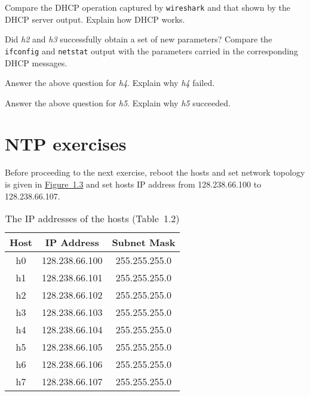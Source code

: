 \documentclass{../UTNetLab}
\begin{document}
    \begin{report}
        \item Compare the DHCP operation captured by \lstinline{wireshark} and that shown by the DHCP server output.
            Explain how DHCP works.
        
        \item Did \textit{h2} and \textit{h3} successfully obtain a set of new parameters?
            Compare the \lstinline{ifconfig} and \lstinline{netstat} output with the parameters carried in the corresponding DHCP messages.
        
        \item Answer the above question for \textit{h4}.
            Explain why \textit{h4} failed.
        
        \item Answer the above question for \textit{h5}.
            Explain why \textit{h5} succeeded.
    \end{report}

\part{NTP exercises}
    Before proceeding to the next exercise, reboot the hosts and set network topology is given in \hyperref[fig:1.3]{Figure~1.3} and set hosts IP address from 128.238.66.100 to 128.238.66.107.
    \begin{center}
        \begin{minipage}{0.48\textwidth}
            \begin{flushleft}
                \begin{table}[H]
                    \caption{The IP addresses of the hosts (Table~1.2)}
                    \centering
                    \begin{tabular}{ c c c }
                        \hline \hline
                        Host & IP Address & Subnet Mask \\
                        \hline 
                        h0 & 128.238.66.100 & 255.255.255.0 \\
                        h1 & 128.238.66.101 & 255.255.255.0 \\
                        h2 & 128.238.66.102 & 255.255.255.0 \\
                        h3 & 128.238.66.103 & 255.255.255.0 \\
                        h4 & 128.238.66.104 & 255.255.255.0 \\
                        h5 & 128.238.66.105 & 255.255.255.0 \\
                        h6 & 128.238.66.106 & 255.255.255.0 \\
                        h7 & 128.238.66.107 & 255.255.255.0 \\
                        \hline \hline
                        \end{tabular}
                \end{table}
            \end{flushleft}
        \end{minipage}
    \end{center}
\end{document}
